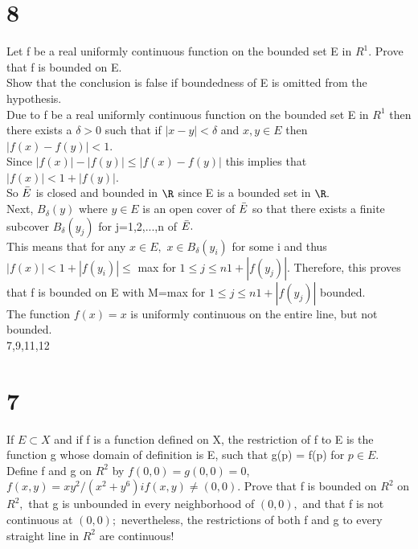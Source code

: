 \section*{8}
Let f be a real uniformly continuous function on the bounded set E in $R^1.$ Prove that f is bounded on E. \\ 
Show that the conclusion is false if boundedness of E is omitted from the hypothesis. \\ 
Due to f be a real uniformly continuous function on the bounded set E in $R^1$ then there exists a $\delta>0$ such that if $|x-y|<\delta$ and $x,y \in E$ then $|f(x)-f(y)|<1.$ \\ 
Since $|f(x)|-|f(y)|\leq |f(x)-f(y)|$ this implies that $|f(x)|<1+|f(y)|.$\\ 
So $\Bar{E}$ is closed and bounded in $\R$ since E is a bounded set in $\R.$ \\ 
Next, ${B_{\delta}(y)}$ where $y \in E$ is an open cover of $\Bar{E}$ so that there exists a finite subcover ${B_{\delta}(y_{j})}$ for j=1,2,...,n of $\Bar{E}.$ \\ 
This means that for any $x \in E,$ $x \in B_{\delta}(y_i)$ for some i and thus $|f(x)|<1+|f(y_i)|\leq$ max for $1\leq j \leq n {1+|f(y_j)|}$.
Therefore, this proves that f is bounded on E with M=max for $1\leq j \leq n {1+|f(y_j)|}$ bounded. \\ 
The function $f(x)=x$ is uniformly continuous on the entire line, but not bounded. \\ 

7,9,11,12
\section*{7}
If $E \subset X$ and if f is a function defined on X, the restriction of f to E is the function g whose domain of definition is E, such that g(p) = f(p) for $p \in E.$ \\ 
Define f and g on $R^2$ by $f(0,0)=g(0,0)=0$, \\ 
$f(x,y)= xy^2/ (x^2 +y^6) if (x,y) \neq (0,0).$ Prove that f is bounded on $R^2$ on $R^2,$ that g is unbounded in every neighborhood of $(0,0),$ and that f is not continuous at $(0,0);$ nevertheless, the restrictions of both f and g to every straight line in $R^2$ are continuous! \\ 

